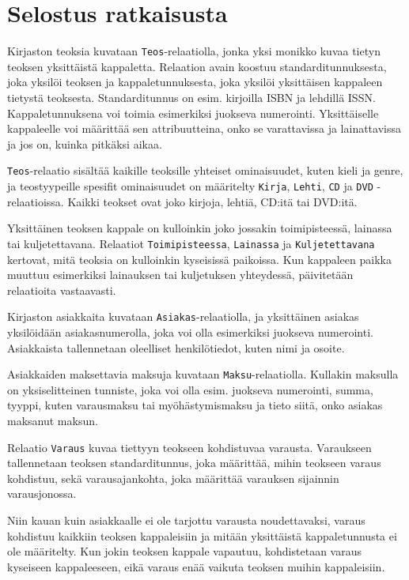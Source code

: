 \documentclass[12pt,titlepage] {article}
\begin{document}
\section {Selostus ratkaisusta}

Kirjaston teoksia kuvataan \texttt{Teos}-relaatiolla, jonka yksi monikko kuvaa tietyn teoksen yksittäistä kappaletta. Relaation avain koostuu standarditunnuksesta, joka yksilöi teoksen ja kappaletunnuksesta, joka yksilöi yksittäisen kappaleen tietystä teoksesta. Standarditunnus on esim. kirjoilla ISBN ja lehdillä ISSN. Kappaletunnuksena voi toimia esimerkiksi juokseva numerointi. Yksittäiselle kappaleelle voi määrittää sen attribuutteina, onko se varattavissa ja lainattavissa ja jos on, kuinka pitkäksi aikaa.

\texttt{Teos}-relaatio sisältää kaikille teoksille yhteiset ominaisuudet, kuten kieli ja genre, ja teostyypeille spesifit ominaisuudet on määritelty \texttt{Kirja}, \texttt{Lehti}, \texttt{CD} ja \texttt{DVD} -relaatioissa. Kaikki teokset ovat joko kirjoja, lehtiä, CD:itä tai DVD:itä.

Yksittäinen teoksen kappale on kulloinkin joko jossakin toimipisteessä, lainassa tai kuljetettavana. Relaatiot \texttt{Toimipisteessa}, \texttt{Lainassa} ja \texttt{Kuljetettavana} kertovat, mitä teoksia on kulloinkin kyseisissä paikoissa. Kun kappaleen paikka muuttuu esimerkiksi lainauksen tai kuljetuksen yhteydessä, päivitetään relaatioita vastaavasti.

Kirjaston asiakkaita kuvataan \texttt{Asiakas}-relaatiolla, ja yksittäinen asiakas yksilöidään asiakasnumerolla, joka voi olla esimerkiksi juokseva numerointi. Asiakkaista tallennetaan oleelliset henkilötiedot, kuten nimi ja osoite.

Asiakkaiden maksettavia maksuja kuvataan \texttt{Maksu}-relaatiolla. Kullakin maksulla on yksiselitteinen tunniste, joka voi olla esim. juokseva numerointi, summa, tyyppi, kuten varausmaksu tai myöhästymismaksu ja tieto siitä, onko asiakas maksanut maksun.

Relaatio \texttt{Varaus} kuvaa tiettyyn teokseen kohdistuvaa varausta. Varaukseen tallennetaan teoksen standarditunnus, joka määrittää, mihin teokseen varaus kohdistuu, sekä varausajankohta, joka määrittää varauksen sijainnin varausjonossa. 

Niin kauan kuin asiakkaalle ei ole tarjottu varausta noudettavaksi, varaus kohdistuu kaikkiin teoksen kappaleisiin ja mitään yksittäistä kappaletunnusta ei ole määritelty. Kun jokin teoksen kappale vapautuu, kohdistetaan varaus kyseiseen kappaleeseen, eikä varaus enää vaikuta teoksen muihin kappaleisiin. 
\end{document}
